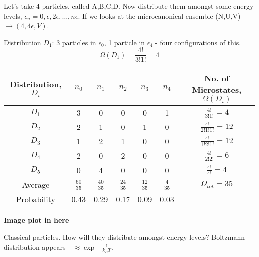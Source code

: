 \documentclass[a4paper, 11pt, normalem]{report}
\newcommand\e{\epsilon}
\begin{document}
\begin{example}
Let's take 4 particles, called A,B,C,D. 
Now distribute them amongst some energy levels, $\e_n = 0, \e, 2\e, \dots, n\e$.
If we looks at the microcanonical ensemble (N,U,V) $\to (4,4\e,V)$.

Distribution $D_1$: 3 particles in $\e_0$, 1 particle in $\e_4$ - four configurations of this.
\begin{equation}
    \Omega(D_1) = \frac{4!}{3!1!} = 4
\end{equation}
\begin{table}[H]
\centering
\begin{tabular}{|c||c|c|c|c|c||c|}
    \hline
    Distribution, $D_i$ & $n_0$ & $n_1$ & $n_2$ & $n_3$ & $n_4$ & No. of Microstates, $\Omega(D_i)$ \\
    \hline
    $D_1$ & 3 & 0 & 0 & 0 & 1 & $\frac{4!}{3!1!} = 4$ \\
    $D_2$ & 2 & 1 & 0 & 1 & 0 & $\frac{4!}{2!1!1!} = 12$ \\
    $D_3$ & 1 & 2 & 1 & 0 & 0 & $\frac{4!}{1!2!1!} = 12$ \\
    $D_4$ & 2 & 0 & 2 & 0 & 0 & $\frac{4!}{2!2!} = 6$ \\
    $D_5$ & 0 & 4 & 0 & 0 & 0 & $\frac{4!}{4!} = 4$ \\
    \hline
    Average & $\frac{60}{35}$ & $\frac{40}{35}$ & $\frac{24}{35}$ & $\frac{12}{35}$ & $\frac{4}{35}$ & $\Omega_{tot} = 35$ \\
    \hline
    Probability & 0.43 & 0.29 & 0.17 & 0.09 & 0.03 & \\
    \hline
\end{tabular}
\end{table}
\textbf{Image plot in here}

Classical particles. How will they distribute amongst energy levels? Boltzmann distribution appears - $\approx \exp{-\frac{\e}{k_BT}}$.
\end{example}
\end{document}
